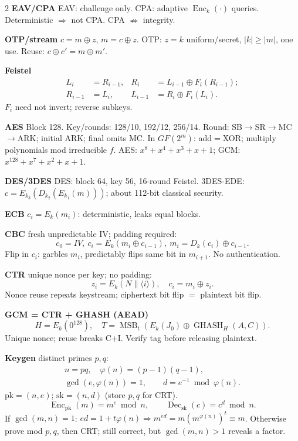 \documentclass[8pt,a4paper]{extarticle}
\newcommand{\sect}[1]{\vspace{4pt plus 5pt}{\bfseries\rule{\linewidth}{0.2pt}\par\vspace{-1.8pt}#1}\par\vspace{-0.2pt}}
\newcommand{\sub}[1]{\vspace{0.5pt plus 2pt}\textbf{#1}\;}
\newcommand{\Enc}{\operatorname{Enc}}
\newcommand{\Dec}{\operatorname{Dec}}
\newcommand{\MSB}{\operatorname{MSB}}
\newcommand{\GHASH}{\operatorname{GHASH}}
\begin{document}
\begin{multicols}{2}
\sub{EAV/CPA} EAV: challenge only. CPA: adaptive $\Enc_k(\cdot)$ queries. Deterministic $\Rightarrow$ not CPA. CPA $\not\Rightarrow$ integrity.

\sub{OTP/stream} $c=m\oplus z$, $m=c\oplus z$. OTP: $z=k$ uniform/secret, $|k|\ge|m|$, one use. Reuse:
$\boxed{c\oplus c'=m\oplus m'}$.

\sub{Feistel}
\[
\begin{aligned}
L_i&=R_{i-1},& R_i&=L_{i-1}\oplus F_i(R_{i-1});\\
R_{i-1}&=L_i,& L_{i-1}&=R_i\oplus F_i(L_i).
\end{aligned}
\]
$F_i$ need not invert; reverse subkeys.

\sub{AES} Block 128. Key/rounds: 128/10, 192/12, 256/14. Round: SB$\to$SR$\to$MC$\to$ARK; initial ARK; final omits MC. In $GF(2^m)$: add$=$XOR; multiply polynomials mod irreducible $f$. AES: $x^8+x^4+x^3+x+1$; GCM: $x^{128}+x^7+x^2+x+1$.

\sub{DES/3DES} DES: block 64, key 56, 16-round Feistel. 3DES-EDE: $c=E_{k_3}(D_{k_2}(E_{k_1}(m)))$; about 112-bit classical security.

\sub{ECB} $c_i=E_k(m_i)$: deterministic, leaks equal blocks.

\sub{CBC} fresh unpredictable IV; padding required:
\[
\boxed{c_0=IV,\ c_i=E_k(m_i\oplus c_{i-1}),\ m_i=D_k(c_i)\oplus c_{i-1}}.
\]
Flip in $c_i$: garbles $m_i$, predictably flips same bit in $m_{i+1}$. No authentication.

\sub{CTR} unique nonce per key; no padding:
\[
\boxed{z_i=E_k(N\|\langle i\rangle),\quad c_i=m_i\oplus z_i}.
\]
Nonce reuse repeats keystream; ciphertext bit flip $=$ plaintext bit flip.

\sub{GCM = CTR + GHASH (AEAD)}
\[
H=E_k(0^{128}),\quad
\boxed{T=\MSB_t(E_k(J_0)\oplus\GHASH_H(A,C))}.
\]
Unique nonce; reuse breaks C+I. Verify tag before releasing plaintext.

\columnbreak
\fontsize{10.4}{11.9}\selectfont
\sect{RSA}
\sub{Keygen} distinct primes $p,q$:
\[
\begin{gathered}
n=pq,\quad \varphi(n)=(p-1)(q-1),\\
\gcd(e,\varphi(n))=1,\qquad
\boxed{d=e^{-1}\bmod\varphi(n)}.
\end{gathered}
\]
$\mathrm{pk}=(n,e)$; $\mathrm{sk}=(n,d)$ (store $p,q$ for CRT).
\[
\boxed{\Enc_{\mathrm{pk}}(m)=m^e\bmod n,\qquad
\Dec_{\mathrm{sk}}(c)=c^d\bmod n}.
\]
If $\gcd(m,n)=1$: $ed=1+t\varphi(n)\Rightarrow m^{ed}=m(m^{\varphi(n)})^t\equiv m$. Otherwise prove mod $p,q$, then CRT; still correct, but $\gcd(m,n)>1$ reveals a factor.


\end{multicols}
\end{document}
